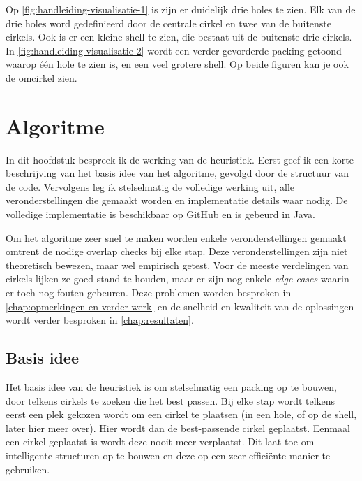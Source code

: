 \documentclass[12pt,a4paper,oneside]{book}
\begin{document}
Op \autoref{fig:handleiding-visualisatie-1} is zijn er duidelijk drie holes te zien.
Elk van de drie holes word gedefinieerd door de centrale cirkel en twee van de buitenste cirkels.
Ook is er een kleine shell te zien, die bestaat uit de buitenste drie cirkels.
In \autoref{fig:handleiding-visualisatie-2} wordt een verder gevorderde packing getoond waarop één hole te zien is, en een veel grotere shell.
Op beide figuren kan je ook de omcirkel zien.

\chapter{Algoritme} \label{chap:algoritme}

In dit hoofdstuk bespreek ik de werking van de heuristiek.
Eerst geef ik een korte beschrijving van het basis idee van het algoritme, gevolgd door de structuur van de code.
Vervolgens leg ik stelselmatig de volledige werking uit, alle veronderstellingen die gemaakt worden en implementatie details waar nodig.
De volledige implementatie is beschikbaar op GitHub \cite{circle-packing-github} en is gebeurd in Java.

Om het algoritme zeer snel te maken worden enkele veronderstellingen gemaakt omtrent de nodige overlap checks bij elke stap.
Deze veronderstellingen zijn niet theoretisch bewezen, maar wel empirisch getest.
Voor de meeste verdelingen van cirkels lijken ze goed stand te houden, maar er zijn nog enkele \textit{edge-cases} waarin er toch nog fouten gebeuren.
Deze problemen worden besproken in \autoref{chap:opmerkingen-en-verder-werk} en de snelheid en kwaliteit van de oplossingen wordt verder besproken in \autoref{chap:resultaten}.

\section{Basis idee}

Het basis idee van de heuristiek is om stelselmatig een packing op te bouwen, door telkens cirkels te zoeken die het best passen.
Bij elke stap wordt telkens eerst een plek gekozen wordt om een cirkel te plaatsen (in een hole, of op de shell, later hier meer over).
Hier wordt dan de best-passende cirkel geplaatst.
Eenmaal een cirkel geplaatst is wordt deze nooit meer verplaatst.
Dit laat toe om intelligente structuren op te bouwen en deze op een zeer efficiënte manier te gebruiken.
\end{document}
